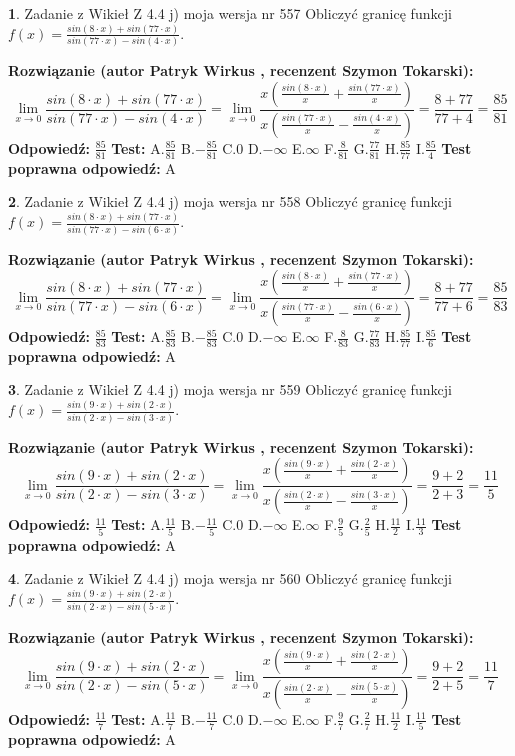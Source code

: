 \documentclass[12pt, a4paper]{article}
\theoremstyle{definition} %
\newtheorem{zad}{}
\newcommand{\zadStart}[1]{\begin{zad}#1\newline}
\newcommand{\zadStop}{\end{zad}}
\newcommand{\rozwStart}[2]{\noindent \textbf{Rozwiązanie (autor #1 , recenzent #2): }\newline}
\newcommand{\rozwStop}{\newline}
\newcommand{\odpStart}{\noindent \textbf{Odpowiedź:}\newline}
\newcommand{\odpStop}{\newline}
\newcommand{\testStart}{\noindent \textbf{Test:}\newline}
\newcommand{\testStop}{\newline}
\newcommand{\kluczStart}{\noindent \textbf{Test poprawna odpowiedź:}\newline}
\newcommand{\kluczStop}{\newline}
\begin{document}
\zadStart{Zadanie z Wikieł Z 4.4 j) moja wersja nr 557}
Obliczyć granicę funkcji $f(x)=\frac{sin(8\cdot x) +sin(77\cdot x)}{sin(77\cdot x) -sin(4\cdot x)}$.
\zadStop
\rozwStart{Patryk Wirkus}{Szymon Tokarski}
$$\lim\limits_{x\to 0}\frac{sin(8\cdot x) +sin(77\cdot x)}{sin(77\cdot x) -sin(4\cdot x)}=\lim\limits_{x\to 0}\frac{x(\frac{sin(8\cdot x)}{x}+\frac{sin(77\cdot x)}{x})}{x(\frac{sin(77\cdot x)}{x}-\frac{sin(4\cdot x)}{x})}=\frac{8+77}{77+4} = \frac{85}{81}$$
\rozwStop
\odpStart
$\frac{85}{81}$
\odpStop
\testStart
A.$\frac{85}{81}$
B.$-\frac{85}{81}$
C.$0$
D.$-\infty$
E.$\infty$
F.$\frac{8}{81}$
G.$\frac{77}{81}$
H.$\frac{85}{77}$
I.$\frac{85}{4}$
\testStop
\kluczStart
A
\kluczStop



\zadStart{Zadanie z Wikieł Z 4.4 j) moja wersja nr 558}
Obliczyć granicę funkcji $f(x)=\frac{sin(8\cdot x) +sin(77\cdot x)}{sin(77\cdot x) -sin(6\cdot x)}$.
\zadStop
\rozwStart{Patryk Wirkus}{Szymon Tokarski}
$$\lim\limits_{x\to 0}\frac{sin(8\cdot x) +sin(77\cdot x)}{sin(77\cdot x) -sin(6\cdot x)}=\lim\limits_{x\to 0}\frac{x(\frac{sin(8\cdot x)}{x}+\frac{sin(77\cdot x)}{x})}{x(\frac{sin(77\cdot x)}{x}-\frac{sin(6\cdot x)}{x})}=\frac{8+77}{77+6} = \frac{85}{83}$$
\rozwStop
\odpStart
$\frac{85}{83}$
\odpStop
\testStart
A.$\frac{85}{83}$
B.$-\frac{85}{83}$
C.$0$
D.$-\infty$
E.$\infty$
F.$\frac{8}{83}$
G.$\frac{77}{83}$
H.$\frac{85}{77}$
I.$\frac{85}{6}$
\testStop
\kluczStart
A
\kluczStop



\zadStart{Zadanie z Wikieł Z 4.4 j) moja wersja nr 559}
Obliczyć granicę funkcji $f(x)=\frac{sin(9\cdot x) +sin(2\cdot x)}{sin(2\cdot x) -sin(3\cdot x)}$.
\zadStop
\rozwStart{Patryk Wirkus}{Szymon Tokarski}
$$\lim\limits_{x\to 0}\frac{sin(9\cdot x) +sin(2\cdot x)}{sin(2\cdot x) -sin(3\cdot x)}=\lim\limits_{x\to 0}\frac{x(\frac{sin(9\cdot x)}{x}+\frac{sin(2\cdot x)}{x})}{x(\frac{sin(2\cdot x)}{x}-\frac{sin(3\cdot x)}{x})}=\frac{9+2}{2+3} = \frac{11}{5}$$
\rozwStop
\odpStart
$\frac{11}{5}$
\odpStop
\testStart
A.$\frac{11}{5}$
B.$-\frac{11}{5}$
C.$0$
D.$-\infty$
E.$\infty$
F.$\frac{9}{5}$
G.$\frac{2}{5}$
H.$\frac{11}{2}$
I.$\frac{11}{3}$
\testStop
\kluczStart
A
\kluczStop



\zadStart{Zadanie z Wikieł Z 4.4 j) moja wersja nr 560}
Obliczyć granicę funkcji $f(x)=\frac{sin(9\cdot x) +sin(2\cdot x)}{sin(2\cdot x) -sin(5\cdot x)}$.
\zadStop
\rozwStart{Patryk Wirkus}{Szymon Tokarski}
$$\lim\limits_{x\to 0}\frac{sin(9\cdot x) +sin(2\cdot x)}{sin(2\cdot x) -sin(5\cdot x)}=\lim\limits_{x\to 0}\frac{x(\frac{sin(9\cdot x)}{x}+\frac{sin(2\cdot x)}{x})}{x(\frac{sin(2\cdot x)}{x}-\frac{sin(5\cdot x)}{x})}=\frac{9+2}{2+5} = \frac{11}{7}$$
\rozwStop
\odpStart
$\frac{11}{7}$
\odpStop
\testStart
A.$\frac{11}{7}$
B.$-\frac{11}{7}$
C.$0$
D.$-\infty$
E.$\infty$
F.$\frac{9}{7}$
G.$\frac{2}{7}$
H.$\frac{11}{2}$
I.$\frac{11}{5}$
\testStop
\kluczStart
A
\kluczStop
\end{document}
